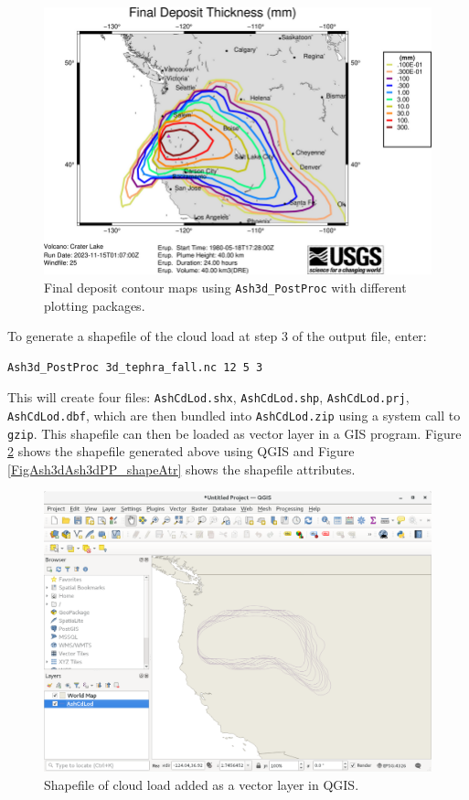 \begin{figure}[htbp]
\includegraphics[angle=0,scale=1.0]{Figures/Ash3d_Deposit____final_gmt.png}
\parbox{15cm}{\caption{\label{FigAsh3dAsh3dPP_map2x2}
Final deposit contour maps using \texttt{Ash3d\_PostProc} with different plotting packages.}}
\end{figure}

To generate a shapefile of the cloud load at step 3 of the output file, enter:
\small
\begin{verbatim}
Ash3d_PostProc 3d_tephra_fall.nc 12 5 3
\end{verbatim}
\normalsize

This will create four files: \texttt{AshCdLod.shx}, \texttt{AshCdLod.shp},
\texttt{AshCdLod.prj}, \texttt{AshCdLod.dbf}, which are then bundled into
\texttt{AshCdLod.zip} using a system call to \texttt{gzip}. This shapefile
can then be loaded as vector layer in a GIS program. Figure \ref{FigAsh3dAsh3dPP_shape} shows
the shapefile generated above using QGIS and Figure \ref{FigAsh3dAsh3dPP_shapeAtr} shows the
shapefile attributes.

\begin{figure}[htbp]
\includegraphics[angle=0,scale=0.35]{Figures/Ash3dOutput_ShpCloudLoad_QGIS.png}
\parbox{15cm}{\caption{\label{FigAsh3dAsh3dPP_shape}
Shapefile of cloud load added as a vector layer in QGIS.}}
\end{figure}


